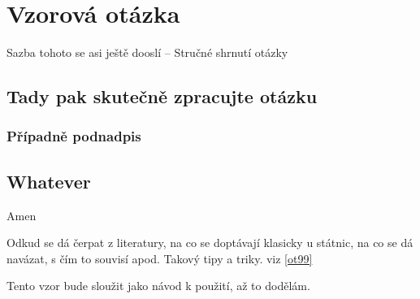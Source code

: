 \section{Vzorová otázka} %

\begin{shrnuti}
Sazba tohoto se asi ještě dooslí -- Stručné shrnutí otázky
\end{shrnuti}

\subsection*{Tady pak skutečně zpracujte otázku}
\lipsum[1]
\subsubsection*{Případně podnadpis}
\lipsum[1]
\subsection*{Whatever}
Amen

\begin{poznamky} %
\item Odkud se dá čerpat z literatury, na co se doptávají klasicky u státnic, na co se dá navázat, s čím to souvisí apod. Takový tipy a triky. viz \ref{ot99}
\item Tento vzor bude sloužit jako návod k použití, až to dodělám.
\end{poznamky}

